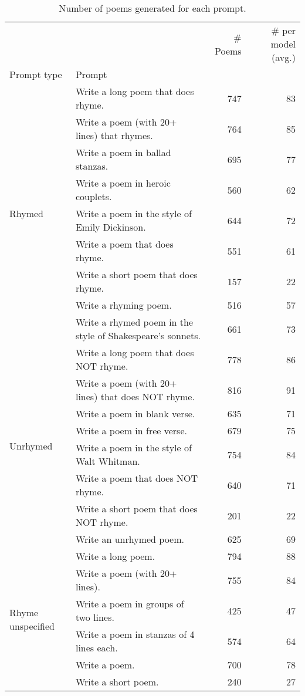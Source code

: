 \begin{table}[H]
  \centering
  \small
  \singlespacing
  \begin{tabular}{llrr}
  \toprule
   &  & \# Poems & \# per model (avg.) \\
  Prompt type & Prompt &  &  \\
  \midrule
  \multirow[t]{9}{*}{Rhymed} & Write a long poem that does rhyme. & 747 & 83 \\
   & Write a poem (with 20+ lines) that rhymes. & 764 & 85 \\
   & Write a poem in ballad stanzas. & 695 & 77 \\
   & Write a poem in heroic couplets. & 560 & 62 \\
   & Write a poem in the style of Emily Dickinson. & 644 & 72 \\
   & Write a poem that does rhyme. & 551 & 61 \\
   & Write a short poem that does rhyme. & 157 & 22 \\
   & Write a rhyming poem. & 516 & 57 \\
   & Write a rhymed poem in the style of Shakespeare's sonnets. & 661 & 73 \\
  \cline{1-4}
  \multirow[t]{8}{*}{Unrhymed} & Write a long poem that does NOT rhyme. & 778 & 86 \\
   & Write a poem (with 20+ lines) that does NOT rhyme. & 816 & 91 \\
   & Write a poem in blank verse. & 635 & 71 \\
   & Write a poem in free verse. & 679 & 75 \\
   & Write a poem in the style of Walt Whitman. & 754 & 84 \\
   & Write a poem that does NOT rhyme. & 640 & 71 \\
   & Write a short poem that does NOT rhyme. & 201 & 22 \\
   & Write an unrhymed poem. & 625 & 69 \\
  \cline{1-4}
  \multirow[t]{6}{*}{Rhyme unspecified} & Write a long poem. & 794 & 88 \\
   & Write a poem (with 20+ lines). & 755 & 84 \\
   & Write a poem in groups of two lines. & 425 & 47 \\
   & Write a poem in stanzas of 4 lines each. & 574 & 64 \\
   & Write a poem. & 700 & 78 \\
   & Write a short poem. & 240 & 27 \\
  \bottomrule
  \end{tabular}
  \caption{Number of poems generated for each prompt.}
  \label{tab:num_poems_rhyme_promptings}
\end{table}